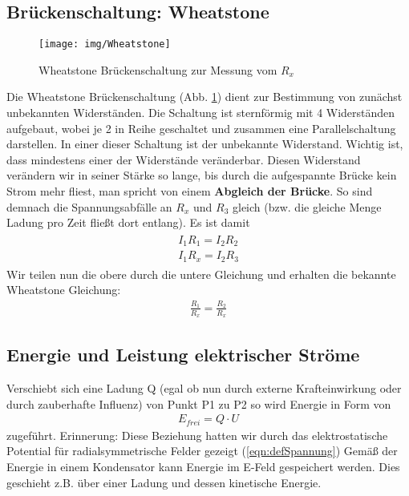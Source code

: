 \subsection{Brückenschaltung: Wheatstone}
\begin{figure}\begin{center}
\texttt{[image: img/Wheatstone]}\end{center}
\caption{Wheatstone Brückenschaltung zur Messung vom $R_x$}
\label{pic:Wheatstone}
\end{figure}
Die Wheatstone Brückenschaltung (Abb. \ref{pic:Wheatstone}) dient zur Bestimmung von zunächst unbekannten Widerständen. Die Schaltung ist sternförmig mit 4 Widerständen aufgebaut, wobei je 2 in Reihe geschaltet und zusammen eine Parallelschaltung darstellen.
In einer dieser Schaltung ist der unbekannte Widerstand. Wichtig ist, dass mindestens einer der Widerstände veränderbar.
Diesen Widerstand verändern wir in seiner Stärke so lange, bis durch die aufgespannte Brücke kein Strom mehr fliest, man spricht von einem \textbf{Abgleich der Brücke}.
So sind demnach die Spannungsabfälle an $R_x$ und $R_3$ gleich (bzw. die gleiche Menge Ladung pro Zeit fließt dort entlang). Es ist damit
\begin{align*} \begin{split}
I_1 R_1 = I_2 R_2 \\
I_1 R_x = I_2 R_3\end{split}
\end{align*}Wir  teilen nun die obere durch die untere Gleichung und erhalten die bekannte Wheatstone Gleichung:
\begin{align} \label{eqn:Wheatstone Schaltung}
\boxed{\frac{R_1}{R_x} = \frac{R_2}{R_x}}
\end{align}

\subsection{Energie und Leistung elektrischer Ströme}
Verschiebt sich eine Ladung Q (egal ob nun durch externe Krafteinwirkung oder durch zauberhafte Influenz) von Punkt P1 zu P2 so wird Energie in Form von 
\begin{align} \label{eqn:Energie el. Strom}
E_{frei} = Q\cdot U
\end{align}zugeführt. Erinnerung: Diese Beziehung hatten wir durch das elektrostatische Potential für radialsymmetrische Felder gezeigt (\ref{eqn:defSpannung})
Gemäß der Energie in einem Kondensator kann Energie im E-Feld gespeichert werden. Dies geschieht z.B. über einer Ladung und dessen kinetische Energie.
